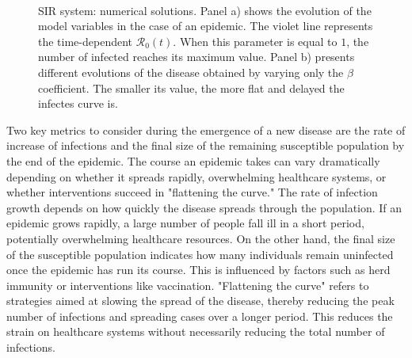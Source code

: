 \begin{figure}[ht]
	\centering
	 \quad
	 \\
	\caption[SIR dynamic example]{SIR system: numerical solutions. Panel a) shows the evolution of the model variables in the case of an epidemic. The violet line represents the time-dependent $\mathcal{R}_0(t)$. When this parameter is equal to $1$, the number of infected reaches its maximum value. Panel b) presents different evolutions of the disease obtained by varying only the $\beta$ coefficient. The smaller its value, the more flat and delayed the infectes curve is.}
	\label{fig:sir_example0}
\end{figure}
Two key metrics to consider during the emergence of a new disease are the rate of increase of infections and the final size of the remaining susceptible population by the end of the epidemic. The course an epidemic takes can vary dramatically depending on whether it spreads rapidly, overwhelming healthcare systems, or whether interventions succeed in "flattening the curve."
The rate of infection growth depends on how quickly the disease spreads through the population. If an epidemic grows rapidly, a large number of people fall ill in a short period, potentially overwhelming healthcare resources.
On the other hand, the final size of the susceptible population indicates how many individuals remain uninfected once the epidemic has run its course. This is influenced by factors such as herd immunity or interventions like vaccination.
"Flattening the curve" refers to strategies aimed at slowing the spread of the disease, thereby reducing the peak number of infections and spreading cases over a longer period. This reduces the strain on healthcare systems without necessarily reducing the total number of infections.

